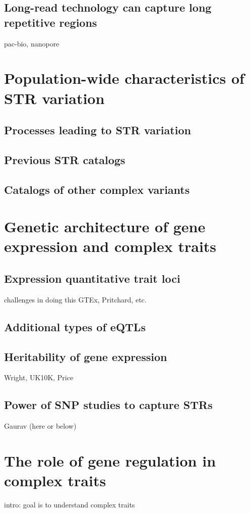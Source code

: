 \subsection{Long-read technology can capture long repetitive regions}
pac-bio, nanopore

\section{Population-wide characteristics of STR variation}
\subsection{Processes leading to STR variation}
\subsection{Previous STR catalogs}
\subsection{Catalogs of other complex variants}

\section{Genetic architecture of gene expression and complex traits}
\subsection{Expression quantitative trait loci}
challenges in doing this
GTEx, Pritchard, etc.
\subsection{Additional types of eQTLs}
\subsection{Heritability of gene expression}
Wright, UK10K, Price
\subsection{Power of SNP studies to capture STRs}
Gaurav (here or below)

\section{The role of gene regulation in complex traits}
intro: goal is to understand complex traits
